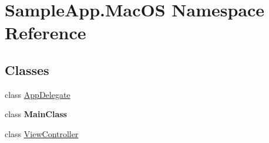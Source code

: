 \hypertarget{namespace_sample_app_1_1_mac_o_s}{}\section{Sample\+App.\+Mac\+OS Namespace Reference}
\label{namespace_sample_app_1_1_mac_o_s}
\subsection*{Classes}
\begin{DoxyCompactItemize}
\item 
class \hyperlink{class_sample_app_1_1_mac_o_s_1_1_app_delegate}{App\+Delegate}
\item 
class {\bfseries Main\+Class}
\item 
class \hyperlink{class_sample_app_1_1_mac_o_s_1_1_view_controller}{View\+Controller}
\end{DoxyCompactItemize}
